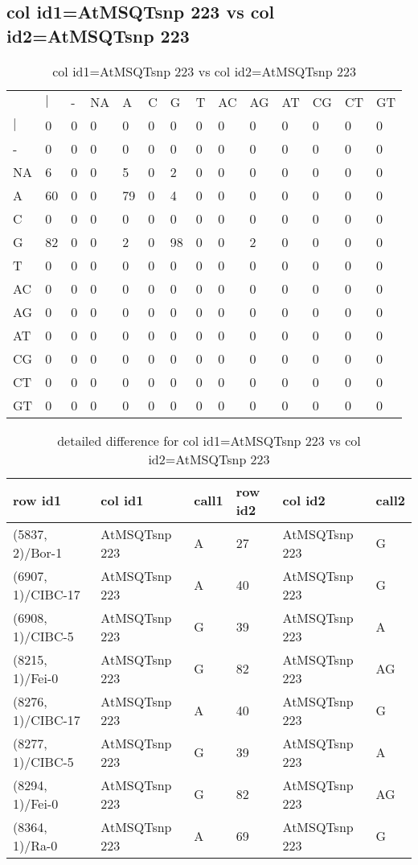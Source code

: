 \subsection{col id1=AtMSQTsnp 223 vs col id2=AtMSQTsnp 223}
\begin{center}
\begin{longtable}{|l|l|l|l|l|l|l|l|l|l|l|l|l|l|}
\caption{col id1=AtMSQTsnp 223 vs col id2=AtMSQTsnp 223} \label{table_dm782}\\
\hline
\\
\hline
&$|$&-&NA&A&C&G&T&AC&AG&AT&CG&CT&GT\\
$|$&0&0&0&0&0&0&0&0&0&0&0&0&0\\
-&0&0&0&0&0&0&0&0&0&0&0&0&0\\
NA&6&0&0&5&0&2&0&0&0&0&0&0&0\\
A&60&0&0&79&0&4&0&0&0&0&0&0&0\\
C&0&0&0&0&0&0&0&0&0&0&0&0&0\\
G&82&0&0&2&0&98&0&0&2&0&0&0&0\\
T&0&0&0&0&0&0&0&0&0&0&0&0&0\\
AC&0&0&0&0&0&0&0&0&0&0&0&0&0\\
AG&0&0&0&0&0&0&0&0&0&0&0&0&0\\
AT&0&0&0&0&0&0&0&0&0&0&0&0&0\\
CG&0&0&0&0&0&0&0&0&0&0&0&0&0\\
CT&0&0&0&0&0&0&0&0&0&0&0&0&0\\
GT&0&0&0&0&0&0&0&0&0&0&0&0&0\\
\hline
\end{longtable}
\end{center}

\begin{center}
\begin{longtable}{|l|l|l|l|l|l|}
\caption{detailed difference for col id1=AtMSQTsnp 223 vs col id2=AtMSQTsnp 223} \label{table_dm783}\\
\hline
row id1&col id1&call1&row id2&col id2&call2\\
\hline
(5837, 2)/Bor-1&AtMSQTsnp 223&A&27&AtMSQTsnp 223&G\\
(6907, 1)/CIBC-17&AtMSQTsnp 223&A&40&AtMSQTsnp 223&G\\
(6908, 1)/CIBC-5&AtMSQTsnp 223&G&39&AtMSQTsnp 223&A\\
(8215, 1)/Fei-0&AtMSQTsnp 223&G&82&AtMSQTsnp 223&AG\\
(8276, 1)/CIBC-17&AtMSQTsnp 223&A&40&AtMSQTsnp 223&G\\
(8277, 1)/CIBC-5&AtMSQTsnp 223&G&39&AtMSQTsnp 223&A\\
(8294, 1)/Fei-0&AtMSQTsnp 223&G&82&AtMSQTsnp 223&AG\\
(8364, 1)/Ra-0&AtMSQTsnp 223&A&69&AtMSQTsnp 223&G\\
\hline
\end{longtable}
\end{center}

